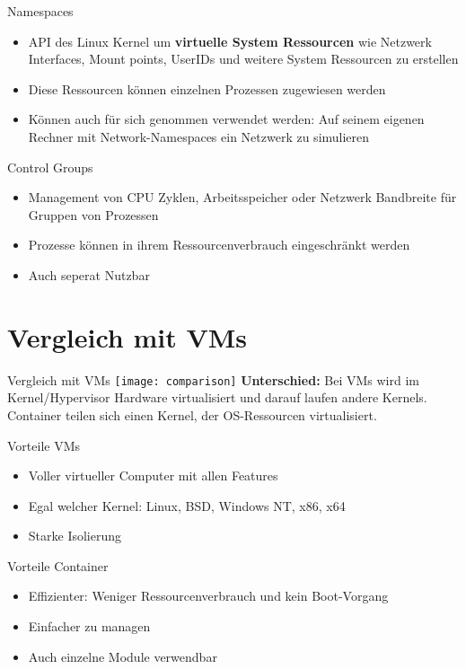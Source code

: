 \documentclass{beamer}
\begin{document}
  \begin{frame}{Namespaces}
    \begin{itemize}[<+->]
      \item API des Linux Kernel um \textbf{virtuelle System Ressourcen} wie Netzwerk Interfaces, Mount points, UserIDs und weitere System Ressourcen zu erstellen
      \item Diese Ressourcen können einzelnen Prozessen zugewiesen
werden
      \item Können auch für sich genommen verwendet werden: Auf seinem eigenen Rechner mit Network-Namespaces ein Netzwerk zu simulieren
    \end{itemize}
  \end{frame}
  
  \begin{frame}{Control Groups}
    \begin{itemize}[<+->]
      \item Management von CPU Zyklen, Arbeitsspeicher oder Netzwerk Bandbreite für Gruppen von Prozessen
      \item Prozesse können in ihrem Ressourcenverbrauch eingeschränkt werden
      \item Auch seperat Nutzbar
    \end{itemize}
  \end{frame}
  
  \section{Vergleich mit VMs}
  \begin{frame}{Vergleich mit VMs}
    \texttt{[image: comparison]}
    \textbf{Unterschied:} Bei VMs wird im Kernel/Hypervisor Hardware virtualisiert und darauf laufen andere Kernels. Container teilen sich einen Kernel, der OS-Ressourcen virtualisiert. 
  \end{frame}
  \begin{frame}{Vorteile VMs}
    \begin{itemize}
      \item Voller virtueller Computer mit allen Features
      \item Egal welcher Kernel: Linux, BSD, Windows NT, x86, x64
      \item Starke Isolierung
    \end{itemize}
  \end{frame}
  \begin{frame}{Vorteile Container}
    \begin{itemize}
      \item Effizienter: Weniger Ressourcenverbrauch und kein Boot-Vorgang
      \item Einfacher zu managen
      \item Auch einzelne Module verwendbar
    \end{itemize}
  \end{frame}
  
\end{document}

